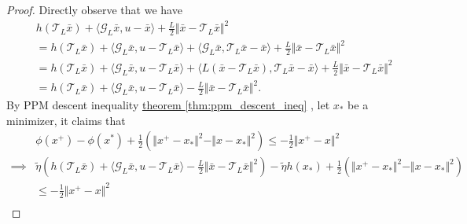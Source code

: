 \documentclass[12pt]{article}
\begin{document}
    \begin{proof}
        Directly observe that we have 
        \begin{align*}
            \quad &
            h(\mathcal T_L\bar x) + 
            \langle \mathcal G_L \bar x, u - \bar x\rangle + 
            \frac{L}{2}\Vert \bar x - \mathcal T_L \bar x\Vert^2
            \\
            &= 
            h(\mathcal T_L \bar x) + 
            \langle \mathcal G_L \bar x, u - \mathcal T_L \bar x\rangle
            + 
            \langle \mathcal G_L \bar x, \mathcal T_L \bar x - \bar x\rangle
            + 
            \frac{L}{2}\Vert \bar x - \mathcal T_L \bar x \Vert^2
            \\
            &= 
            h(\mathcal T_L \bar x) + 
            \langle \mathcal G_L \bar x, u - \mathcal T_L \bar x\rangle
            + 
            \langle 
                L (\bar x - \mathcal T_L \bar x)
                , 
                \mathcal T_L \bar x - \bar x
            \rangle
            + 
            \frac{L}{2}\Vert \bar x - \mathcal T_L \bar x\Vert^2
            \\
            &= 
            h(\mathcal T_L \bar x) + 
            \langle \mathcal G_L \bar x, u - \mathcal T_L \bar x\rangle 
            - \frac{L}{2} \Vert \bar x - \mathcal T_L \bar x\Vert^2. 
        \end{align*}
        By PPM descent inequality
        \hyperref[thm:ppm_descent_ineq]{theorem \ref*{thm:ppm_descent_ineq}}
        , let $x_*$ be a minimizer, it claims that 
        {\small
        \begin{align*}
            & 
            \phi(x^+) - \phi (x^*) + 
            \frac{1}{2}\left(
                \Vert x^+ - x_*\Vert^2 - 
                \Vert x - x_*\Vert^2
            \right)
            \le 
            - \frac{1}{2}\Vert x^+ - x\Vert^2
            \\
            \implies &
            \tilde 
            \eta 
            \left(   
                h(\mathcal T_L \bar x) + 
                \langle \mathcal G_L \bar x, u - \mathcal T_L \bar x\rangle 
                - \frac{L}{2} \Vert \bar x - \mathcal T_L \bar x\Vert^2
            \right)
            - \tilde \eta h (x_*)
            +
            \frac{1}{2}\left(
                \Vert x^+ - x_*\Vert^2 - 
                \Vert x - x_*\Vert^2
            \right)
            \\
            &\le 
            - \frac{1}{2}\Vert x^+ - x\Vert^2
            \\

\end{align*}}
\end{proof}
\end{document}
